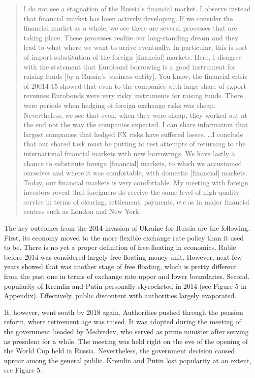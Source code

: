 \begin{quote}
 I do not see a stagnation of the Russia's financial market. I observe
 instead that financial market has been actively developing. If we
 consider the financial market as a whole, we see there are several
 processes that are taking place. These processes realize our
 long-standing dream and they lead to what where we want to arrive
 eventually. In particular, this is sort of import substitution of the
 foreign [financial] markets. Here, I disagree with the statement that
 Eurobond borrowing is a good instrument for raising funds [by a
 Russia's business entity]. You know, the financial crisis of 20014-15
 showed that even to the companies with large share of export revenues
 Eurobonds were very risky instruments for raising funds. There were
 periods when hedging of foreign exchange risks was cheap.
 Nevertheless, we see that even, when they were cheap, they worked out
 at the end not the way the companies expected. I can share information
 that largest companies that hedged FX risks have suffered losses.
 \dots I conclude that our shared task must be putting to rest attempts
 of returning to the international financial markets with new
 borrowings. We have lastly a chance to substitute foreign [financial]
 markets, to which we accustomed ourselves and where it was
 comfortable, with domestic [financial] markets. Today, our financial
 markets is very comfortable. My meeting with foreign investors reveal
 that foreigners do receive the same level of high-quality service in
 terms of clearing, settlement, payments, etc as in major financial
 centers such as London and New York.~\citep{moiseev}
\end{quote}

The key outcomes from the 2014 invasion of Ukraine for Russia are the
following. First, its economy moved to the more flexible exchange rate
policy than it used to be. There is no yet a proper definition of
free-floating in economics. Ruble before 2014 was considered largely
free-floating money unit. However, next few years showed that was
another stage of free floating, which is pretty different from the past
one in terms of exchange rate upper and lower boundaries. Second,
popularity of Kremlin and Putin personally skyrocketed in 2014 (see
Figure 5 in Appendix). Effectively, public discontent with authorities
largely evaporated.

It, however, went south by 2018 again. Authorities pushed through the
pension reform, where retirement age was raised. It was adopted during
the meeting of the government headed by Medvedev, who served as prime
minister after serving as president for a while. The meeting was held
right on the eve of the opening of the World Cup held in Russia.
Nevertheless, the government decision caused uproar among the general
public. Kremlin and Putin lost popularity at an extent, see Figure 5.

